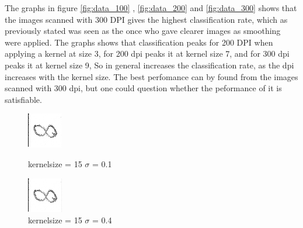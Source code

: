The graphs in figure \ref{fig:data_100} , \ref{fig:data_200}  and \ref{fig:data_300} 
 shows that the images scanned with 300 DPI gives the highest classification rate,
which as previously stated was seen as the once who gave clearer images as smoothing were applied.
 The graphs shows that classification peaks for 200 DPI when applying a kernel at size 3,
 for 200 dpi peaks it at kernel size 7, and for 300 dpi peaks it at kernel size 9,
 So in general increases the classification rate, as the dpi increases with the kernel size.
 The best perfomance can by found from the images scanned with 300 dpi,
 but one could question whether the peformance of it is satisfiable. 

\begin{figure}[H]    
	\begin{minipage}[t]{0.30\textwidth}
			\centering
			\includegraphics[width=0.4\linewidth]{Figure/mikael_8_2_dpi300_k15_sig_01.png}
			\caption{kernelsize = 15 $\sigma$ = 0.1}
			\label{fig:dpi_300_k_9_s_0.1}
	\end{minipage}
	\hspace{\fill}	
	\begin{minipage}[t]{0.30\textwidth}
		\centering
			\includegraphics[width=0.4\linewidth]{Figure/mikael_8_2_dpi300_k15_sig_04.png}
			\caption{kernelsize = 15 $\sigma$ = 0.4}
			\label{fig:dpi_300_k_9_s_0.4}
	\end{minipage}
	\hspace{\fill}
	\begin{minipage}[t]{0.30\textwidth}

\end{minipage}
\end{figure}
